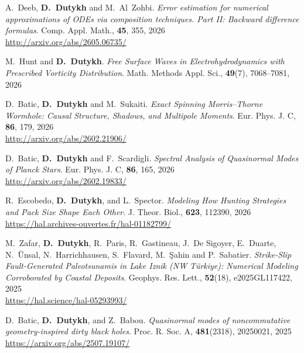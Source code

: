\documentclass[final, a4paper, oneside, 12pt]{article}
\numberwithin{equation}{section}
\begin{document}
\begin{etaremune}
  \item A.~Deeb, \textbf{D.~Dutykh} and M.~Al~Zohbi.  \textit{Error estimation for numerical approximations of ODEs via composition techniques. Part II: Backward difference formulas}. Comp. Appl. Math., \textbf{45}, 355, 2026 \\ %
  \url{http://arxiv.org/abs/2605.06735/}

  \item M.~Hunt and \textbf{D.~Dutykh}. \textit{Free Surface Waves in Electrohydrodynamics with Prescribed Vorticity Distribution}. Math. Methods Appl. Sci., \textbf{49}(7), 7068--7081, 2026 %

  \item D.~Batic, \textbf{D.~Dutykh} and M.~Sukaiti. \textit{Exact Spinning Morris--Thorne Wormhole: Causal Structure, Shadows, and Multipole Moments}. Eur. Phys. J. C, \textbf{86}, 179, 2026 \\ %
  \url{http://arxiv.org/abs/2602.21906/}

  \item D.~Batic, \textbf{D.~Dutykh} and F.~Scardigli. \textit{Spectral Analysis of Quasinormal Modes of Planck Stars}. Eur. Phys. J. C, \textbf{86}, 165, 2026 \\ %
  \url{http://arxiv.org/abs/2602.19833/}

  \item R.~Escobedo, \textbf{D.~Dutykh}, and L.~Spector. \textit{Modeling How Hunting Strategies and Pack Size Shape Each Other}. J. Theor. Biol., \textbf{623}, 112390, 2026 \\ %
  \url{https://hal.archives-ouvertes.fr/hal-01182799/}

  
  
  \item M.~Zafar, \textbf{D.~Dutykh}, R.~Paris, R.~Gastineau, J.~De Sigoyer, E.~Duarte, N.~\"Unsal, N.~Harrichhausen, S.~Flavard, M.~\c{S}ahin and P.~Sabatier. \textit{Strike-Slip Fault-Generated Paleotsunamis in Lake Iznik (NW T\"{u}rkiye): Numerical Modeling Corroborated by Coastal Deposits}. Geophys. Res. Lett., \textbf{52}(18), e2025GL117422, 2025 \\ %
  \url{https://hal.science/hal-05293993/}
  
  \item D.~Batic, \textbf{D.~Dutykh}, and Z.~Babou. \textit{Quasinormal modes of noncommutative geometry-inspired dirty black holes}. Proc. R. Soc. A, \textbf{481}(2318), 20250021, 2025 \\ %
  \url{https://arxiv.org/abs/2507.19107/}


\end{etaremune}
\end{document}
